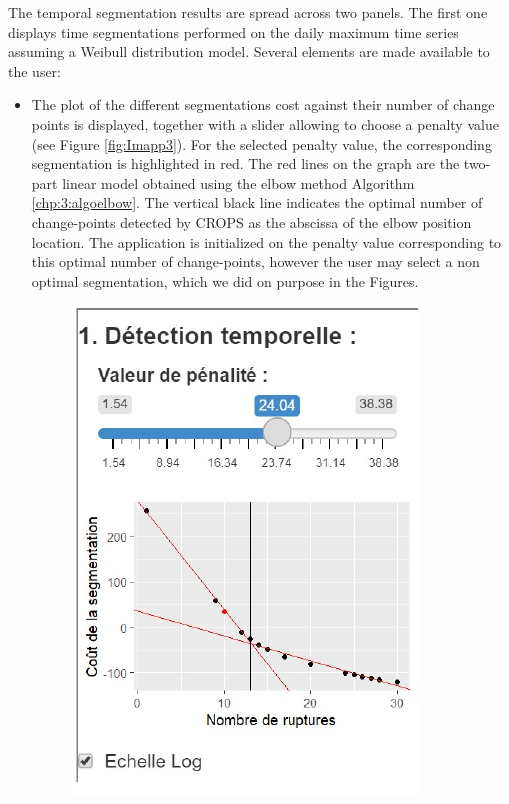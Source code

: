  
The temporal segmentation results are spread across two panels. The first one displays time segmentations performed on the daily maximum time series assuming a Weibull distribution model. Several elements are made available to the user:
\begin{itemize}
\item The plot of the different segmentations cost against their number of change points is displayed, together with a slider allowing to choose a penalty value (see Figure \ref{fig:Imapp3}). For the selected penalty value, the corresponding segmentation is highlighted in red. The red lines on the graph are the two-part linear model obtained using the elbow method Algorithm \ref{chp:3:algoelbow}. The vertical black line indicates the optimal number of change-points detected by CROPS as the abscissa of the elbow position location. The application is initialized on the penalty value corresponding to this optimal number of change-points, however the user may select a non optimal segmentation, which we did on purpose in the Figures. 
\begin{figure}[htbp]
  \centering
  \includegraphics[]{figs/Chap6/Im_appbis3.pdf}

\end{figure}
\end{itemize}
